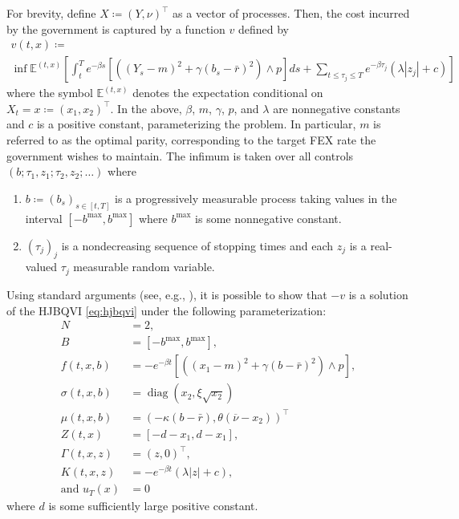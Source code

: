 \documentclass[12pt]{article}
\begin{document}
For brevity, define $X\coloneqq(Y,\nu)^{\intercal}$ as a vector of
processes. Then, the cost incurred by the government is captured by
a function $v$ defined by
\begin{multline}
v(t,x)\coloneqq\\
\inf\mathbb{E}^{(t,x)}\left[\int_{t}^{T}e^{-\beta s}\left[\left(\left(Y_{s}-m\right)^{2}+\gamma\left(b_{s}-\bar{r}\right)^{2}\right)\wedge p\right]ds+\sum_{t{\leqslant}\tau_{j}{\leqslant} T}e^{-\beta\tau_{j}}\left(\lambda\left|z_{j}\right|+c\right)\right]\label{eq:fex_value}
\end{multline}
where the symbol $\mathbb{E}^{(t,x)}$ denotes the expectation conditional
on $X_{t}=x\coloneqq(x_{1},x_{2})^{\intercal}$. In the above, $\beta$,
$m$, $\gamma$, $p$, and $\lambda$ are nonnegative constants and
$c$ is a positive constant, parameterizing the problem. In particular,
$m$ is referred to as the optimal parity, corresponding to the target
FEX rate the government wishes to maintain. The infimum is taken over
all controls $(b;\tau_{1},z_{1};\tau_{2},z_{2};\ldots)$ where
\begin{enumerate}[label=(A\arabic*)]
\item $b\coloneqq(b_{s})_{s\in[t,T]}$ is a progressively measurable process
taking values in the interval $[-b^{\max},b^{\max}]$ where $b^{\max}$
is some nonnegative constant.
\item \label{enu:gmwb_impulse_assumptions-1}$(\tau_{j})_{j}$ is a nondecreasing
sequence of stopping times and each $z_{j}$ is a real-valued $\tau_{j}$
measurable random variable.
\end{enumerate}
Using standard arguments (see, e.g., \cite{MR1614233,MR2568293}),
it is possible to show that $-v$ is a solution of the HJBQVI \eqref{eq:hjbqvi}
under the following parameterization:
\begin{align*}
N & =2,\\
B & =[-b^{\max},b^{\max}],\\
f(t,x,b) & =-e^{-\beta t}[((x_{1}-m)^{2}+\gamma(b-\bar{r})^{2})\wedge p],\\
\sigma(t,x,b) & ={\operatorname{diag}}(x_{2},\xi\sqrt{x_{2}})\\
\mu(t,x,b) & =(-\kappa(b-\bar{r}),\theta(\overline{\nu}-x_{2}))^{\intercal}\\
Z(t,x) & =[-d-x_{1},d-x_{1}],\\
\Gamma(t,x,z) & =(z,0)^{\intercal},\\
K(t,x,z) & =-e^{-\beta t}(\lambda|z|+c),\\
\text{and }u_{T}(x) & =0
\end{align*}
where $d$ is some sufficiently large positive constant.
\end{document}
